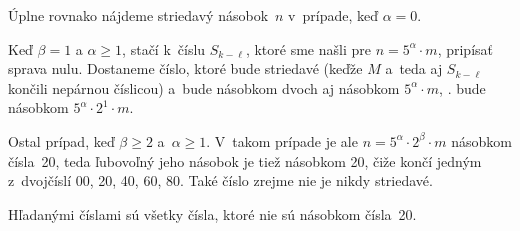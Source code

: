 {Úplne rovnako nájdeme striedavý násobok~$n$ v~prípade, keď $\alpha=0$. 

Keď $\beta=1$ a $\alpha\ge1$, stačí k~číslu $S_{k-\ell}$, ktoré sme našli pre $n=5^\alpha\cdot m$, pripísať sprava nulu. Dostaneme číslo, ktoré bude striedavé (keďže $M$ a~teda aj $S_{k-\ell}$ končili nepárnou číslicou) a~bude násobkom dvoch aj násobkom $5^\alpha\cdot m$, \tj. bude násobkom $5^\alpha\cdot2^1\cdot m$.

Ostal prípad, keď $\beta\ge2$ a~$\alpha\ge1$. V~takom prípade je ale $n=5^\alpha\cdot2^\beta\cdot m$ násobkom čísla~20, teda ľubovoľný jeho násobok je tiež násobkom 20, čiže končí jedným z~dvojčíslí 00, 20, 40, 60, 80. Také číslo zrejme nie je nikdy striedavé.

\odpoved
Hľadanými číslami sú všetky čísla, ktoré nie sú násobkom čísla~20.}


